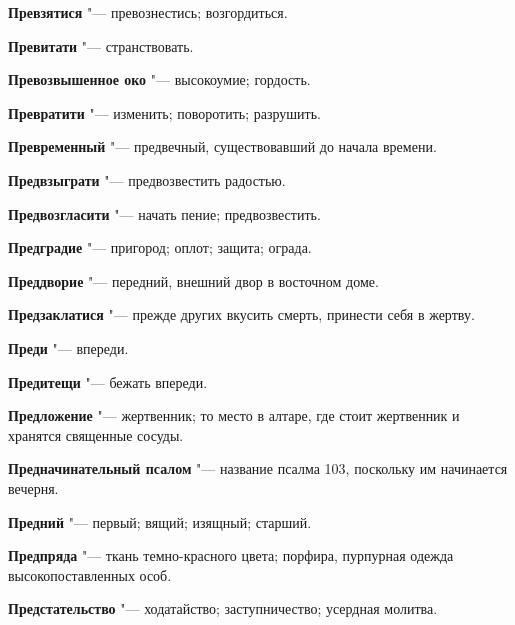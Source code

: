 \begin{mymulticols}{2}
\noindent\textbf{Превзятися} "--- превознестись; возгордиться. 




\noindent\textbf{Превитати} "--- странствовать. 




\noindent\textbf{Превозвышенное око} "--- высокоумие; гордость. 




\noindent\textbf{Превратити} "--- изменить; поворотить; разрушить. 




\noindent\textbf{Превременный} "--- предвечный, существовавший до начала времени. 




\noindent\textbf{Предвзыграти} "--- предвозвестить радостью. 




\noindent\textbf{Предвозгласити} "--- начать пение; предвозвестить. 




\noindent\textbf{Предградие} "--- пригород; оплот; защита; ограда. 




\noindent\textbf{Преддворие} "--- передний, внешний двор в восточном доме. 




\noindent\textbf{Предзаклатися} "--- прежде других вкусить смерть, принести себя в жертву. 




\noindent\textbf{Преди} "--- впереди. 




\noindent\textbf{Предитещи} "--- бежать впереди. 




\noindent\textbf{Предложение} "--- жертвенник; то место в алтаре, где стоит жертвенник и хранятся священные сосуды. 




\noindent\textbf{Предначинательный псалом} "--- название псалма 103, поскольку им начинается вечерня. 




\noindent\textbf{Предний} "--- первый; вящий; изящный; старший. 




\noindent\textbf{Предпряда} "--- ткань темно-красного цвета; порфира, пурпурная одежда высокопоставленных особ. 




\noindent\textbf{Предстательство} "--- ходатайство; заступничество; усердная молитва. 





\end{mymulticols}
